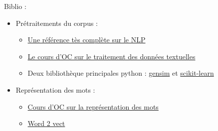 \documentclass[a4paper,11pt]{article}
\begin{document}
Biblio : 
\begin{itemize}
    \item Prétraitements du corpus :
        \begin{itemize}
            \item {\color{blue} \href{http://www.nltk.org/book/}{Une référence tès complète sur le NLP}}
            \item  {\color{blue} \href{https://openclassrooms.com/fr/courses/4470541-analysez-vos-donnees-textuelles/ }{Le cours d'OC sur le traitement des données textuelles}}
            \item Deux bibliothèque principales python : {\color{blue} \href{https://radimrehurek.com/gensim/}{gensim}} et {\color{blue} \href{ https://scikit-learn.org/stable/tutorial/text_analytics/working_with_text_data.html}{scikit-learn}}
        \end{itemize}
    \item Représentation des mots : 
        \begin{itemize}
            \item {\color{blue} \href{https://openclassrooms.com/fr/courses/4470541-analysez-vos-donnees-textuelles/4855001-representez-votre-corpus-en-bag-of-words}{Cours d'OC sur la représentation des mots} }
            \item {\color{blue} \href{https://www.kaggle.com/c/word2vec-nlp-tutorial#part-1-for-beginners-bag-of-words}{Word 2 vect} }
        \end{itemize}
        

\end{itemize}
\end{document}
